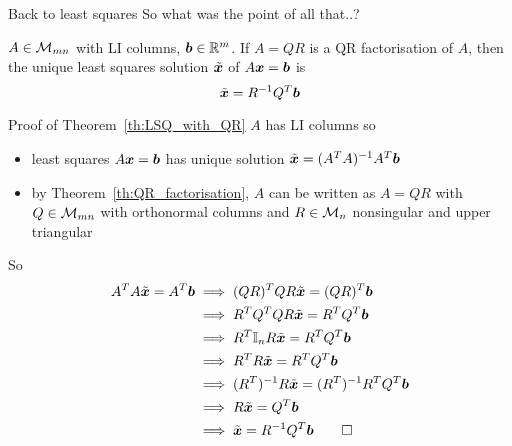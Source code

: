 \documentclass[aspectratio=169]{beamer}\usepackage[]{graphicx}\usepackage[]{xcolor}
\begin{document}
\begin{frame}{Back to least squares}
So what was the point of all that..?
\vfill
\begin{theorem}
\label{th:LSQ_with_QR}
$A\in\mathcal{M}_{mn}$ with LI columns, $\bm{b}\in\mathbb{R}^m$. If $A=QR$ is a QR factorisation of $A$, then the unique least squares solution $\tilde{\bm{x}}$ of $A\bm{x}=\bm{b}$ is
\[
\tilde{\bm{x}} = R^{-1}Q^T\bm{b}
\]
\end{theorem}
\end{frame}


\begin{frame}{Proof of Theorem~\ref{th:LSQ_with_QR}}
$A$ has LI columns so 
\begin{itemize}
\item least squares $A\bm{x}=\bm{b}$ has unique solution $\tilde{\bm{x}}=(A^TA)^{-1}A^T\bm{b}$
\item by Theorem~\ref{th:QR_factorisation}, $A$ can be written as $A=QR$ with $Q\in\mathcal{M}_{mn}$ with orthonormal columns and $R\in\mathcal{M}_n$ nonsingular and upper triangular
\end{itemize}
So
\begin{align*}
A^TA\tilde\bx= A^T\bb &\implies (QR)^TQR\tilde\bx = (QR)^T\bb \\
&\implies R^TQ^TQR\tilde\bx = R^TQ^T\bb \\
&\implies R^T\II_nR\tilde\bx = R^TQ^T\bb \\
&\implies R^TR\tilde\bx = R^TQ^T\bb \\
&\implies (R^T)^{-1}R\tilde\bx = (R^T)^{-1}R^TQ^T\bb \\
&\implies R\tilde\bx = Q^T\bb \\
&\implies \tilde\bx = R^{-1}Q^T\bb\hfill\qed
\end{align*}
\end{frame}
\end{document}
